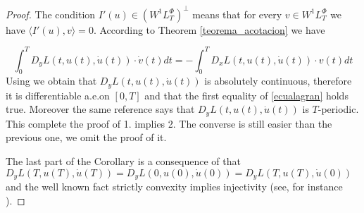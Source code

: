 \documentclass[twoside]{article}
\newcommand{\lphi}{L^{\Phi}}
\newcommand{\wphi}{W^{1}\lphi}
\begin{document}
\begin{proof} The condition $I'(u)\in\left( \wphi_T\right)^{\perp}$ means that for every $v\in \wphi_T$ we have $\langle I'(u),v\rangle=0$. According to Theorem
\ref{teorema_acotacion} we have

\[\int_0^TD_yL(t,u(t),\dot{u}(t))\cdot \dot{v}(t)dt=-\int_0^TD_xL(t,u(t),\dot{u}(t))\cdot v(t)dt \]
Using \cite[pag. 6]{mawhin2010critical} we obtain that $D_yL(t,u(t),\dot{u}(t))$ is absolutely continuous, therefore it is differentiable a.e.on $[0,T]$ and that the first equality
of \ref{ecualagran} holds true. Moreover the same reference says that $D_yL(t,u(t),\dot{u}(t))$ is $T$-periodic.
This complete the proof of 1. implies 2. The converse is still easier than the previous one, we omit the proof of it.

The last part of the Corollary is a consequence of that $D_yL(T,u(T),\dot{u}(T))=D_yL(0,u(0),\dot{u}(0))=D_yL(T,u(T),\dot{u}(0))$ and the well known fact strictly
convexity implies injectivity (see, for instance \cite[Theorem 12.17]{rockafellar2009variational}).




\end{proof}

 



\end{document}
